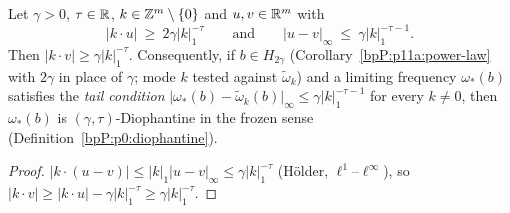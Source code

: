 \begin{lemma}\label{bpP:p11a:limit-bridge}
Let $\gamma>0$, $\tau\in\mathbb{R}$, $k\in\mathbb{Z}^m\setminus\{0\}$ and $u,v\in\mathbb{R}^m$ with
\[\lvert k\cdot u\rvert\ \ge\ 2\gamma\lvert k\rvert_1^{-\tau}\qquad\text{and}\qquad\lvert u-v\rvert_\infty\ \le\ \gamma\lvert k\rvert_1^{-\tau-1}.\]
Then $\lvert k\cdot v\rvert\ge\gamma\lvert k\rvert_1^{-\tau}$. Consequently, if $b\in H_{2\gamma}$ (Corollary~\ref{bpP:p11a:power-law} with $2\gamma$ in place of $\gamma$; mode $k$ tested against $\tilde\omega_k$) and a limiting frequency $\omega_*(b)$ satisfies the \emph{tail condition} $\lvert\omega_*(b)-\tilde\omega_k(b)\rvert_\infty\le\gamma\lvert k\rvert_1^{-\tau-1}$ for every $k\ne0$, then $\omega_*(b)$ is $(\gamma,\tau)$-Diophantine in the frozen sense (Definition~\ref{bpP:p0:diophantine}).
\end{lemma}
\begin{proof}
$\lvert k\cdot(u-v)\rvert\le\lvert k\rvert_1\lvert u-v\rvert_\infty\le\gamma\lvert k\rvert_1^{-\tau}$ (H\"older, $\ell^1$--$\ell^\infty$), so $\lvert k\cdot v\rvert\ge\lvert k\cdot u\rvert-\gamma\lvert k\rvert_1^{-\tau}\ge\gamma\lvert k\rvert_1^{-\tau}$.
\end{proof}

